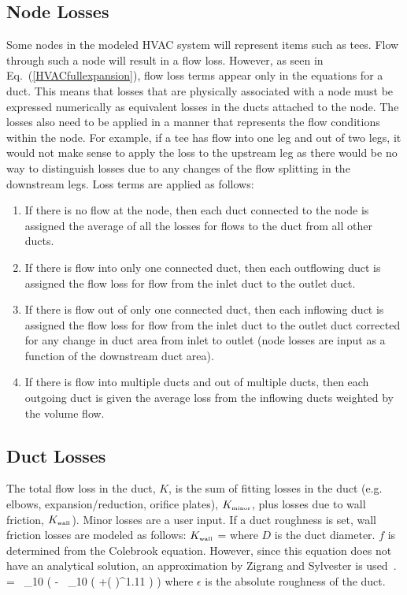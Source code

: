 \subsection{Node Losses}

Some nodes in the modeled HVAC system will represent items such as tees.  Flow through such a node will result in a flow loss.  However, as seen in Eq.~(\ref{HVACfullexpansion}), flow loss terms appear only in the equations for a duct.  This means that losses that are physically associated with a node must be expressed numerically as equivalent losses in the ducts attached to the node.  The losses also need to be applied in a manner that represents the flow conditions within the node.  For example, if a tee has flow into one leg and out of two legs, it would not make sense to apply the loss to the upstream leg as there would be no way to distinguish losses due to any changes of the flow splitting in the downstream legs.  Loss terms are applied as follows:

\begin{enumerate}
\item If there is no flow at the node, then each duct connected to the node is assigned the average of all the losses for flows to the duct from all other ducts.
\item If there is flow into only one connected duct, then each outflowing duct is assigned the flow loss for flow from the inlet duct to the outlet duct.
\item If there is flow out of only one connected duct, then each inflowing duct is assigned the flow loss for flow from the inlet duct to the outlet duct corrected for any change in duct area from inlet to outlet (node losses are input as a function of the downstream duct area).
\item If there is flow into multiple ducts and out of multiple ducts, then each outgoing duct is given the average loss from the inflowing ducts weighted by the volume flow.
\end{enumerate}

\subsection{Duct Losses}

The total flow loss in the duct, $K$, is the sum of fitting losses in the duct (e.g. elbows, expansion/reduction, orifice plates), \(K_{\mbox{\tiny minor}}\), plus losses due to wall friction, \(K_{\mbox{\tiny wall}}\)).  Minor losses are a user input. If a duct roughness is set, wall friction losses are modeled as follows:
\be \(K_{\mbox{\tiny wall}}\) \; = \;  \ee
where $D$ is the duct diameter.  $f$ is determined from the Colebrook equation. However, since this equation does not have an analytical solution, an approximation by Zigrang and Sylvester is used~\cite{Zigrang:1}.
\be {} \; =  \, \log_{10} \left(\; - \;  \, \log_{10} \left(
+\left(  \right)^{1.11} \right) \right) \ee
where $\epsilon$ is the absolute roughness of the duct.


